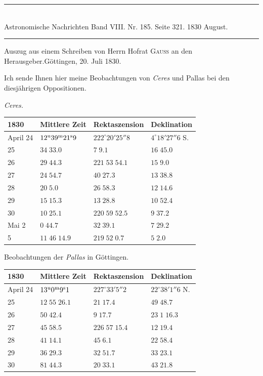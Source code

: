 \clearpage
{}
\hypertarget{native-467-letter}{}
\begin{center}
\rule{0.55\linewidth}{0.4pt}\\[2pt]
Astronomische Nachrichten Band VIII. Nr. 185. Seite 321. 1830 August.\\[2pt]
\rule{0.55\linewidth}{0.4pt}
\end{center}

\begin{center}Auszug aus einem Schreiben von Herrn Hofrat \textsc{Gauss} an den Herausgeber.\quad Göttingen, 20. Juli 1830.\end{center}

Ich sende Ihnen hier meine Beobachtungen von \emph{Ceres} und Pallas bei den diesjährigen Oppositionen.

\begin{center}
\emph{Ceres.}

\begin{tabular}{l|l|l|l}
1830 & Mittlere Zeit & Rektaszension & Deklination \\
\hline
April 24 & $12^{\rm u}39^{\rm m}21^{\rm s}9$ & $222^\circ20'25''8$ & $4^\circ18'27''6$ S. \\
\hfill 25 & $34\;33.0$ & $7\;9.1$ & $16\;45.0$ \\
\hfill 26 & $29\;44.3$ & $221\;53\;54.1$ & $15\;9.0$ \\
\hfill 27 & $24\;54.7$ & $40\;27.3$ & $13\;38.8$ \\
\hfill 28 & $20\;5.0$ & $26\;58.3$ & $12\;14.6$ \\
\hfill 29 & $15\;15.3$ & $13\;28.8$ & $10\;52.4$ \\
\hfill 30 & $10\;25.1$ & $220\;59\;52.5$ & $9\;37.2$ \\
Mai 2 & $0\;44.7$ & $32\;39.1$ & $7\;29.2$ \\
\hfill 5 & $11\;46\;14.9$ & $219\;52\;0.7$ & $5\;2.0$ \\
\end{tabular}
\end{center}

\begin{center}
Beobachtungen der \emph{Pallas} in Göttingen.

\begin{tabular}{l|l|l|l}
1830 & Mittlere Zeit & Rektaszension & Deklination \\
\hline
April 24 & $13^{\rm u}0^{\rm m}9^{\rm s}1$ & $227^\circ33'5''2$ & $22^\circ38'1''6$ N. \\
\hfill 25 & $12\;55\;26.1$ & $21\;17.4$ & $49\;48.7$ \\
\hfill 26 & $50\;42.4$ & $9\;17.7$ & $23\;1\;16.3$ \\
\hfill 27 & $45\;58.5$ & $226\;57\;15.4$ & $12\;19.4$ \\
\hfill 28 & $41\;14.1$ & $45\;6.1$ & $22\;58.4$ \\
\hfill 29 & $36\;29.3$ & $32\;51.7$ & $33\;23.1$ \\
\hfill 30 & $81\;44.3$ & $20\;33.1$ & $43\;21.8$ \\
\end{tabular}
\end{center}

